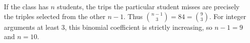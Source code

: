 If the class has $ n $ students, the trips the particular student misses are precisely the triples selected from the other $ n-1 $. Thus $\binom{n-1}{3}=84=\binom93 $. For integer arguments at least $ 3 $, this binomial coefficient is strictly increasing, so $ n-1=9 $ and $\boxed{n=10}$.
